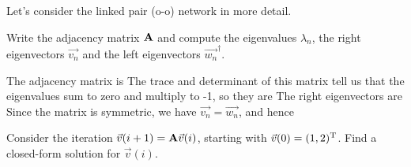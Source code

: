 Let's consider the linked pair (o-o) network in more detail. 

\subquestion Write the adjacency matrix $\bf A$ and compute the eigenvalues $\lambda_n$, the right eigenvectors $\vec{v_n}$ and the left eigenvectors $\vec{w_n}^\dag$. 

\solution 
The adjacency matrix is 
The trace and determinant of this matrix tell us that the eigenvalues sum to zero and multiply to -1, so they are 
The right eigenvectors are 
Since the matrix is symmetric, we have $\vec{v_n}=\vec{w_n}$, and hence

\subquestion Consider the iteration $\vec{v}(i+1) = {\bf A} \vec{v}(i)$, starting with $\vec{v}(0)=(1,2)^{\rm T}$. Find a closed-form solution for $\vec{v}(i)$. 


